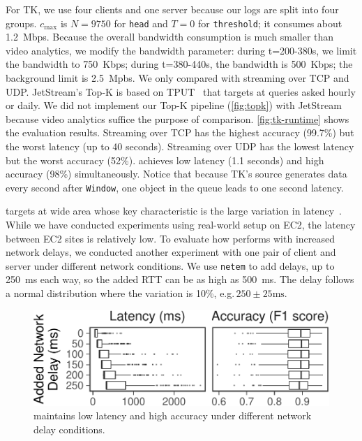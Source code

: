  For TK, we use four clients and one server because our logs are
split into four groups. $c_{\max}$ is $N=9750$ for \texttt{head} and $T=0$ for
\texttt{threshold}; it consumes about \SI{1.2}{Mbps}. Because the overall
bandwidth consumption is much smaller than video analytics, we modify the
bandwidth parameter: during t=200-380s, we limit the bandwidth to
\SI{750}{Kbps}; during t=380-440s, the bandwidth is \SI{500}{Kbps}; the
background limit is \SI{2.5}{Mpbs}. We only compared \sysname{} with streaming
over TCP and UDP. JetStream's Top-K is based on TPUT~\cite{cao2004efficient}
that targets at queries asked hourly or daily. We did not implement our Top-K
pipeline (\autoref{fig:topk}) with JetStream because video analytics suffice the
purpose of comparison. \autoref{fig:tk-runtime} shows the evaluation
results. Streaming over TCP has the highest accuracy (99.7\%) but the worst
latency (up to 40 seconds). Streaming over UDP has the lowest latency but the
worst accuracy (52\%). \sysname{} achieves low latency (1.1 seconds) and high
accuracy (98\%) simultaneously. Notice that because TK's source generates data
every second after \texttt{Window}, one object in the queue leads to one second
latency.

\vspace{0.3em}
\vspace{0.2em}

\noindent \sysname{} targets at wide area whose key characteristic is the large
variation in latency~\cite{li2010cloudcmp}. While we have conducted experiments
using real-world setup on EC2, the latency between EC2 sites is relatively low.
To evaluate how \sysname{} performs with increased network delays, we conducted
another experiment with one pair of client and server under different network
conditions. We use \texttt{netem} to add delays, up to \SI{250}{ms} each way, so
the added RTT can be as high as \SI{500}{ms}. The delay follows a normal
distribution where the variation is 10\%, e.g.\,$250\pm 25\text{ms}$.

\begin{figure}
  \centering
  \includegraphics[width=.88\columnwidth]{figures/runtime_darknet-bench.pdf}
  \caption{\sysname{} maintains low latency and high accuracy under different
    network delay conditions.}
  \label{fig:ar-rtt}
  \vspace{-0.5em}
\end{figure}

